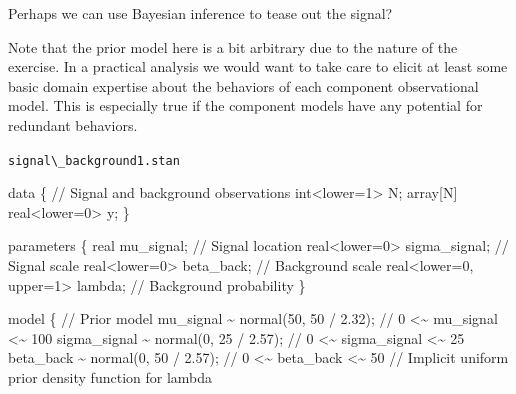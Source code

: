 \documentclass[
  letterpaper,
  DIV=11,
  numbers=noendperiod]{scrartcl}
\newenvironment{Shaded}{\begin{snugshade}}{\end{snugshade}}
\newcommand{\CommentTok}[1]{\textcolor[rgb]{0.37,0.37,0.37}{#1}}
\newcommand{\DataTypeTok}[1]{\textcolor[rgb]{0.68,0.00,0.00}{#1}}
\newcommand{\DecValTok}[1]{\textcolor[rgb]{0.68,0.00,0.00}{#1}}
\newcommand{\FloatTok}[1]{\textcolor[rgb]{0.68,0.00,0.00}{#1}}
\newcommand{\KeywordTok}[1]{\textcolor[rgb]{0.00,0.23,0.31}{#1}}
\newcommand{\NormalTok}[1]{\textcolor[rgb]{0.00,0.23,0.31}{#1}}
\begin{document}
Perhaps we can use Bayesian inference to tease out the signal?

Note that the prior model here is a bit arbitrary due to the nature of
the exercise. In a practical analysis we would want to take care to
elicit at least some basic domain expertise about the behaviors of each
component observational model. This is especially true if the component
models have any potential for redundant behaviors.

\begin{codelisting}

\caption{\texttt{signal\textbackslash\_background1.stan}}

\begin{Shaded}
\begin{Highlighting}[]
\KeywordTok{data}\NormalTok{ \{}
  \CommentTok{// Signal and background observations}
  \DataTypeTok{int}\NormalTok{\textless{}}\KeywordTok{lower}\NormalTok{=}\DecValTok{1}\NormalTok{\textgreater{} N;}
  \DataTypeTok{array}\NormalTok{[N] }\DataTypeTok{real}\NormalTok{\textless{}}\KeywordTok{lower}\NormalTok{=}\DecValTok{0}\NormalTok{\textgreater{} y;}
\NormalTok{\}}

\KeywordTok{parameters}\NormalTok{ \{}
  \DataTypeTok{real}\NormalTok{ mu\_signal;                }\CommentTok{// Signal location}
  \DataTypeTok{real}\NormalTok{\textless{}}\KeywordTok{lower}\NormalTok{=}\DecValTok{0}\NormalTok{\textgreater{} sigma\_signal;    }\CommentTok{// Signal scale}
  \DataTypeTok{real}\NormalTok{\textless{}}\KeywordTok{lower}\NormalTok{=}\DecValTok{0}\NormalTok{\textgreater{} beta\_back;       }\CommentTok{// Background scale}
  \DataTypeTok{real}\NormalTok{\textless{}}\KeywordTok{lower}\NormalTok{=}\DecValTok{0}\NormalTok{, }\KeywordTok{upper}\NormalTok{=}\DecValTok{1}\NormalTok{\textgreater{} lambda; }\CommentTok{// Background probability}
\NormalTok{\}}

\KeywordTok{model}\NormalTok{ \{}
  \CommentTok{// Prior model}
\NormalTok{  mu\_signal \textasciitilde{} normal(}\DecValTok{50}\NormalTok{, }\DecValTok{50}\NormalTok{ / }\FloatTok{2.32}\NormalTok{);   }\CommentTok{// 0 \textless{}\textasciitilde{} mu\_signal    \textless{}\textasciitilde{} 100}
\NormalTok{  sigma\_signal \textasciitilde{} normal(}\DecValTok{0}\NormalTok{, }\DecValTok{25}\NormalTok{ / }\FloatTok{2.57}\NormalTok{); }\CommentTok{// 0 \textless{}\textasciitilde{} sigma\_signal \textless{}\textasciitilde{}  25}
\NormalTok{  beta\_back \textasciitilde{} normal(}\DecValTok{0}\NormalTok{, }\DecValTok{50}\NormalTok{ / }\FloatTok{2.57}\NormalTok{);    }\CommentTok{// 0 \textless{}\textasciitilde{} beta\_back    \textless{}\textasciitilde{}  50}
  \CommentTok{// Implicit uniform prior density function for lambda}


\end{Highlighting}
\end{Shaded}
\end{codelisting}
\end{document}
